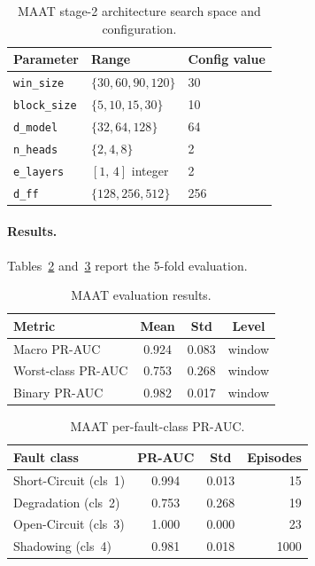 \begin{table}[H]
\centering
\caption{MAAT stage-2 architecture search space and configuration.\label{tab:maat-s2}}
\begin{tabular}{lll}
\toprule
\textbf{Parameter} & \textbf{Range} & \textbf{Config value} \\
\midrule
\texttt{win\_size}   & $\{30,60,90,120\}$   & 30  \\
\texttt{block\_size} & $\{5,10,15,30\}$     & 10  \\
\texttt{d\_model}    & $\{32,64,128\}$      & 64  \\
\texttt{n\_heads}    & $\{2,4,8\}$          & 2   \\
\texttt{e\_layers}   & $[1,\,4]$ integer    & 2   \\
\texttt{d\_ff}       & $\{128,256,512\}$    & 256 \\
\bottomrule
\end{tabular}
\end{table}

\paragraph{Results.}
Tables~\ref{tab:maat-results} and~\ref{tab:maat-per-class} report the 5-fold evaluation.

\begin{table}[H]
\centering
\caption{MAAT evaluation results.\label{tab:maat-results}}
\begin{tabular}{lccc}
\toprule
\textbf{Metric} & \textbf{Mean} & \textbf{Std} & \textbf{Level} \\
\midrule
Macro PR-AUC & 0.924 & 0.083 & window \\
Worst-class PR-AUC     & 0.753 & 0.268 & window \\
Binary PR-AUC          & 0.982 & 0.017 & window \\
\bottomrule
\end{tabular}
\end{table}

\begin{table}[H]
\centering
\caption{MAAT per-fault-class PR-AUC.\label{tab:maat-per-class}}
\begin{tabular}{lccr}
\toprule
\textbf{Fault class} & \textbf{PR-AUC} & \textbf{Std} & \textbf{Episodes} \\
\midrule
Short-Circuit (cls~1) & 0.994 & 0.013 & 15 \\
Degradation   (cls~2) & 0.753 & 0.268 & 19 \\
Open-Circuit  (cls~3) & 1.000 & 0.000 & 23 \\
Shadowing     (cls~4) & 0.981 & 0.018 & 1000 \\
\bottomrule
\end{tabular}
\end{table}

